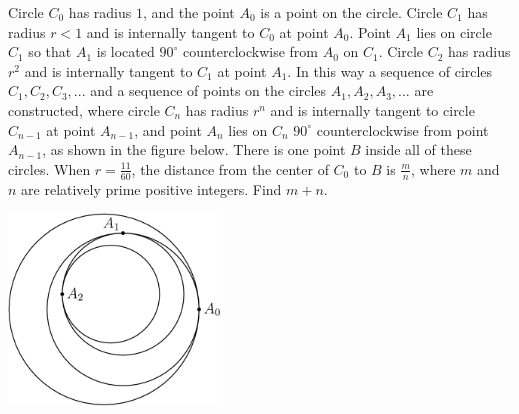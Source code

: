 Circle $C_0$ has radius $1$, and the point $A_0$ is a point on the circle. Circle $C_1$ has radius $r<1$ and is internally tangent to $C_0$ at point $A_0$. Point $A_1$ lies on circle $C_1$ so that $A_1$ is located $90^{\circ}$ counterclockwise from $A_0$ on $C_1$. Circle $C_2$ has radius $r^2$ and is internally tangent to $C_1$ at point $A_1$. In this way a sequence of circles $C_1,C_2,C_3,...$ and a sequence of points on the circles $A_1,A_2,A_3,...$ are constructed, where circle $C_n$ has radius $r^n$ and is internally tangent to circle $C_{n-1}$ at point $A_{n-1}$, and point $A_n$ lies on $C_n$ $90^{\circ}$ counterclockwise from point $A_{n-1}$, as shown in the figure below. There is one point $B$ inside all of these circles. When $r=\frac{11}{60}$, the distance from the center of $C_0$ to $B$ is $\frac{m}{n}$, where $m$ and $n$ are relatively prime positive integers. Find $m+n$.

\begin{center}
\includegraphics[width = 57.0mm]{img/fig0.png}
\end{center}